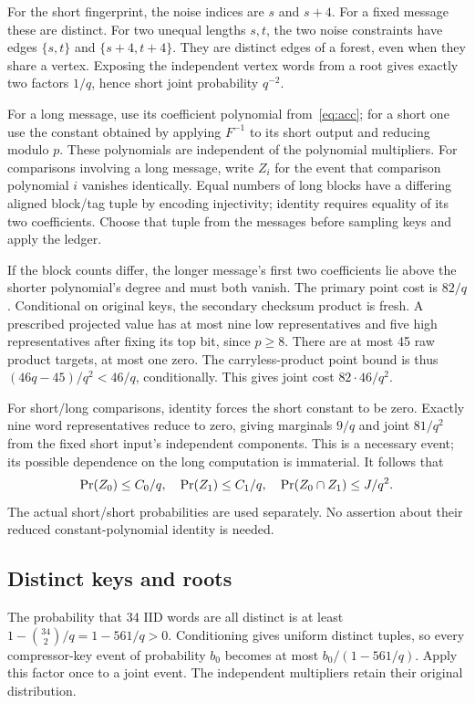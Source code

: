 For the short fingerprint, the noise indices are $s$ and $s+4$. For a fixed message these are distinct. For two unequal lengths $s,t$, the two noise constraints have edges $\{s,t\}$ and $\{s+4,t+4\}$. They are distinct edges of a forest, even when they share a vertex. Exposing the independent vertex words from a root gives exactly two factors $1/q$, hence short joint probability $q^{-2}$.

For a long message, use its coefficient polynomial from~\eqref{eq:acc}; for a short one use the constant obtained by applying $F^{-1}$ to its short output and reducing modulo $p$. These polynomials are independent of the polynomial multipliers. For comparisons involving a long message, write $Z_i$ for the event that comparison polynomial $i$ vanishes identically. Equal numbers of long blocks have a differing aligned block/tag tuple by encoding injectivity; identity requires equality of its two coefficients. Choose that tuple from the messages before sampling keys and apply the ledger.

If the block counts differ, the longer message's first two coefficients lie above the shorter polynomial's degree and must both vanish. The primary point cost is $82/q$. Conditional on original keys, the secondary checksum product is fresh. A prescribed projected value has at most nine low representatives and five high representatives after fixing its top bit, since $p\ge8$. There are at most 45 raw product targets, at most one zero. The carryless-product point bound is thus $(46q-45)/q^2<46/q$, conditionally. This gives joint cost $82\cdot46/q^2$.

For short/long comparisons, identity forces the short constant to be zero. Exactly nine word representatives reduce to zero, giving marginals $9/q$ and joint $81/q^2$ from the fixed short input's independent components. This is a necessary event; its possible dependence on the long computation is immaterial. It follows that
\begin{equation}\label{eq:identity}
 \mathop{\rm Pr}(Z_0)\le C_0/q,\quad \mathop{\rm Pr}(Z_1)\le C_1/q,\quad
 \mathop{\rm Pr}(Z_0\cap Z_1)\le J/q^2.
\end{equation}
The actual short/short probabilities are used separately. No assertion about their reduced constant-polynomial identity is needed.

\subsection{Distinct keys and roots}
The probability that 34 IID words are all distinct is at least $1-\binom{34}{2}/q=1-561/q>0$. Conditioning gives uniform distinct tuples, so every compressor-key event of probability $b_0$ becomes at most $b_0/(1-561/q)$. Apply this factor once to a joint event. The independent multipliers retain their original distribution.


